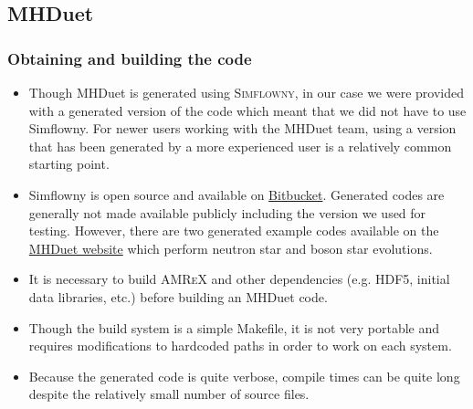 \documentclass[12pt,a4paper]{article}
\numberwithin{figure}{subsection}
\newcommand{\amrex}{\textsc{AMReX}\xspace}
\newcommand{\simflowny}{\textsc{Simflowny}\xspace}
\begin{document}
\subsection{MHDuet}

\subsubsection{Obtaining and building the code}
\begin{itemize}
    \item Though MHDuet is generated using \simflowny, in our case we were
    provided with a generated version of the code which meant that we did not
    have to use Simflowny. For newer users working with the MHDuet team, using a version that
    has been generated by a more experienced user is a relatively common starting point.
    \item Simflowny is open source and available on
    \href{https://bitbucket.org/iac3/simflowny/}{Bitbucket}.  Generated codes
    are generally not made available publicly including the version we used for
    testing. However, there are two generated example codes available
    on the \href{https://mhduet.liu.edu/}{MHDuet website} which perform 
    neutron star and boson star evolutions.
    \item It is necessary to build \amrex and other dependencies (e.g. HDF5,
    initial data libraries, etc.) before building an MHDuet code.
    \item Though the build system is a simple Makefile, it is not very portable and
    requires modifications to hardcoded paths in order to work on each system.
    \item Because the generated code is quite verbose, compile times can be quite
    long despite the relatively small number of source files.
\end{itemize}
\end{document}
